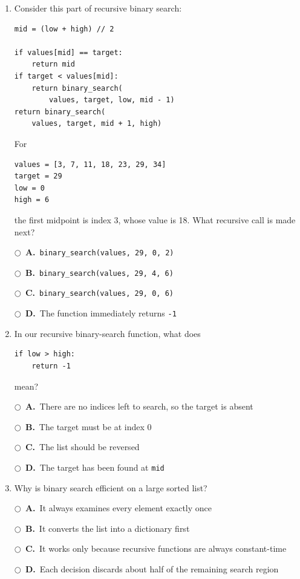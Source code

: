 \documentclass[11pt]{article}
\newcommand{\choice}[2]{%
    \par\noindent
    \(\bigcirc\)\ \textbf{#1.}\ #2
}
\begin{document}
\begin{enumerate}
\begin{verbatim}
def fact(n):
    if n <= 1:
        return 1
    return n * fact(n)
\end{verbatim}

Why does this implementation fail for \texttt{fact(5)}?

\choice{A}{The base case should return 0}
\choice{B}{The recursive call uses the same \texttt{n}, so it never moves toward the base case}
\choice{C}{Multiplication is not allowed in a recursive function}
\choice{D}{Recursive functions must contain a \texttt{for} loop}

\item Consider this part of recursive binary search:

\begin{verbatim}
mid = (low + high) // 2

if values[mid] == target:
    return mid
if target < values[mid]:
    return binary_search(
        values, target, low, mid - 1)
return binary_search(
    values, target, mid + 1, high)
\end{verbatim}

For

\begin{verbatim}
values = [3, 7, 11, 18, 23, 29, 34]
target = 29
low = 0
high = 6
\end{verbatim}

the first midpoint is index 3, whose value is 18. What recursive call is made next?

\choice{A}{\texttt{binary\_search(values, 29, 0, 2)}}
\choice{B}{\texttt{binary\_search(values, 29, 4, 6)}}
\choice{C}{\texttt{binary\_search(values, 29, 0, 6)}}
\choice{D}{The function immediately returns \texttt{-1}}

\item In our recursive binary-search function, what does

\begin{verbatim}
if low > high:
    return -1
\end{verbatim}

mean?

\choice{A}{There are no indices left to search, so the target is absent}
\choice{B}{The target must be at index 0}
\choice{C}{The list should be reversed}
\choice{D}{The target has been found at \texttt{mid}}

\item Why is binary search efficient on a large sorted list?

\choice{A}{It always examines every element exactly once}
\choice{B}{It converts the list into a dictionary first}
\choice{C}{It works only because recursive functions are always constant-time}
\choice{D}{Each decision discards about half of the remaining search region}

\end{enumerate}
\end{document}
